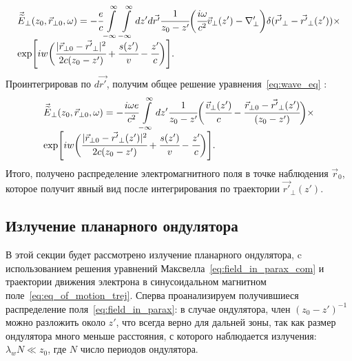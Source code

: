 \begin{equation}
	\begin{array}{lcl}
		\vec{\widetilde{E}}_{\bot}(z_0,  \vec{r}_{\bot 0}, \omega) = -\cfrac{e}{c}  \displaystyle\int\limits_{-\infty}^{\infty}\int\limits_{-\infty}^{\infty} dz'd\vec{r'}\cfrac{1}{z_0 - z'}
		\bigg(\cfrac{i\omega}{c^2}\vec{v}_{\bot}(z')
		-\nabla'_{\bot}\bigg) \delta(\vec{r'}_{\bot} - \vec{r'}_{\bot}(z'))\times\\
		\exp[iw\bigg( \cfrac{|\vec{r}_{\bot 0} - \vec{r'}_{\bot}|^2}{2c(z_0 - z')} +\cfrac{s(z')}{v} - \cfrac{z'}{c} \bigg)].
	\end{array}	
\end{equation}
Проинтегрировав по $d\vec{r'}$, получим общее решение уравнения~\ref{eq:wave_eq} :
\begin{equation}
	\label{eq:field_in_parax_com}
	\begin{array}{lcl}
		\vec{\widetilde{E}}_{\bot}(z_0,  \vec{r}_{\bot 0}, \omega) = -\cfrac{i\omega e}{c^2}  \displaystyle\int\limits_{-\infty}^{\infty} dz'
		\cfrac{1}{z_0 - z'}
		\bigg(\cfrac{\vec{v}_{\bot}(z')}{c}
		- \cfrac{\vec{r}_{\bot 0} - \vec{r'}_{\bot}(z')}{(z_0 - z')}\bigg)\times\\
		\exp[iw\bigg(\cfrac{|\vec{r}_{\bot 0} - \vec{r'}_{\bot}(z')|^2}{2c(z_0 - z')} + \cfrac{s(z')}{v} - \cfrac{z'}{c} \bigg)].
	\end{array}	
\end{equation}
Итого, получено распределение электромагнитного поля в точке наблюдения $\vec{r}_0$, которое получит явный вид после интегрирования по траектории $\vec{r'}_{\bot}(z')$.

\subsection{Излучение планарного ондулятора}
В этой секции будет рассмотрено излучение планарного ондулятора, c использованием решения уравнений Максвелла~\ref{eq:field_in_parax_com} и траектории движения электрона в синусоидальном магнитном поле~\ref{eq:eq_of_motion_trej}. Сперва проанализируем получившиеся распределение поля~\ref{eq:field_in_parax}: в случае ондулятора, член $(z_0 - z')^{-1}$ можно разложить около $z'$, что всегда верно для дальней зоны, так как размер ондулятора много меньше расстояния, с которого наблюдается излучения: $\lambda_w N \ll z_0$, где $N$ число периодов ондулятора.

